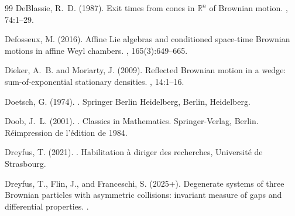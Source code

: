 \documentclass[11pt]{article}
\theoremstyle{definition}
\begin{document}
\begin{thebibliography}{99}
DeBlassie, R.~D. (1987).
\newblock Exit times from cones in {$\mathbb{R}^n$} of {Brownian} motion.
, 74:1--29.

Defosseux, M. (2016).
\newblock Affine Lie algebras and conditioned space-time Brownian motions in
  affine Weyl chambers.
, 165(3):649--665.




Dieker, A.~B. and Moriarty, J. (2009).
\newblock Reflected {Brownian} motion in a wedge: sum-of-exponential stationary
  densities.
, 14:1--16.

Doetsch, G. (1974).
.
\newblock Springer Berlin Heidelberg, Berlin, Heidelberg.

Doob, J.~L. (2001).
.
\newblock Classics in Mathematics. Springer-Verlag, Berlin.
\newblock Réimpression de l'édition de 1984.

Dreyfus, T. (2021).
.
\newblock Habilitation {\`a} diriger des recherches, {Universit{\'e} de
  Strasbourg}.
  
Dreyfus, T., Flin, J., and Franceschi, S. (2025+).
\newblock Degenerate systems of three Brownian particles with asymmetric collisions: invariant measure of gaps and differential properties.
.


\end{thebibliography}
\end{document}
